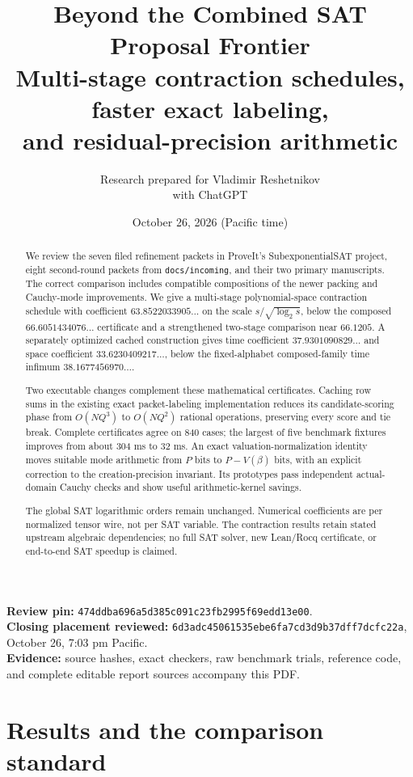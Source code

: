 \documentclass[11pt,letterpaper]{article}
\title{\textbf{Beyond the Combined SAT Proposal Frontier}\\[5pt]
\large Multi-stage contraction schedules, faster exact labeling,\\
and residual-precision arithmetic}
\author{Research prepared for Vladimir Reshetnikov\\\small with ChatGPT}
\date{October 26, 2026 (Pacific time)}
\theoremstyle{remark}\newtheorem{remark}[theorem]{Remark}
\newcommand{\pin}{\texttt{474ddba696a5d385c091c23fb2995f69edd13e00}}
\begin{document}
\maketitle
\begin{abstract}
We review the seven filed refinement packets in ProveIt's
SubexponentialSAT project, eight second-round packets from
\texttt{docs/incoming}, and their two primary manuscripts. The correct
comparison includes compatible compositions of the newer packing and
Cauchy-mode improvements. We give a multi-stage polynomial-space
contraction schedule with coefficient $63.8522033905\ldots$ on the scale
$s/\sqrt{\log_2s}$, below the composed $66.6051434076\ldots$ certificate
and a strengthened two-stage comparison near $66.1205$. A separately
optimized cached construction gives time coefficient $37.9301090829\ldots$
and space coefficient $33.6230409217\ldots$, below the fixed-alphabet
composed-family time infimum $38.1677456970\ldots$.

Two executable changes complement these mathematical certificates. Caching
row sums in the existing exact packet-labeling implementation reduces its
candidate-scoring phase from $O(NQ^3)$ to $O(NQ^2)$ rational operations,
preserving every score and tie break. Complete certificates agree on 840
cases; the largest of five benchmark fixtures improves from about 304 ms
to 32 ms. An exact valuation-normalization identity moves suitable mode
arithmetic from $P$ bits to $P-V(\beta)$ bits, with an explicit correction
to the creation-precision invariant. Its prototypes pass independent
actual-domain Cauchy checks and show useful arithmetic-kernel savings.

The global SAT logarithmic orders remain unchanged. Numerical coefficients
are per normalized tensor wire, not per SAT variable. The contraction
results retain stated upstream algebraic dependencies; no full SAT solver,
new Lean/Rocq certificate, or end-to-end SAT speedup is claimed.
\end{abstract}
\noindent\textbf{Review pin:} \pin.\\
\textbf{Closing placement reviewed:}
\texttt{6d3adc45061535ebe6fa7cd3d9b37dff7dcfc22a}, October 26, 7:03 pm Pacific.\\
\textbf{Evidence:} source hashes, exact checkers, raw benchmark trials,
reference code, and complete editable report sources accompany this PDF.
\clearpage
\tableofcontents
\clearpage

\section{Results and the comparison standard}
\label{sec:outcome}
\end{document}
